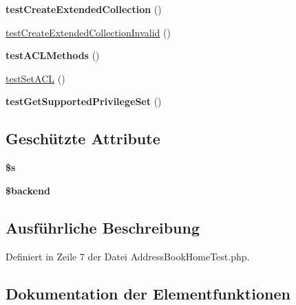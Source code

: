 \begin{DoxyCompactItemize}
\mbox{\label{class_sabre_1_1_card_d_a_v_1_1_address_book_home_test_ab820411cfd34b07fac5bac303b542208}} 
{\bfseries test\+Create\+Extended\+Collection} ()
\item 
\mbox{\hyperlink{class_sabre_1_1_card_d_a_v_1_1_address_book_home_test_a183b90b2e32963dc65a106dfca60597d}{test\+Create\+Extended\+Collection\+Invalid}} ()
\item 
\mbox{\label{class_sabre_1_1_card_d_a_v_1_1_address_book_home_test_ac26b7cca220adcf7f5667603dd3ce708}} 
{\bfseries test\+A\+C\+L\+Methods} ()
\item 
\mbox{\hyperlink{class_sabre_1_1_card_d_a_v_1_1_address_book_home_test_abfb7a825b347f0bd7d0af6ba4ae63881}{test\+Set\+A\+CL}} ()
\item 
\mbox{\label{class_sabre_1_1_card_d_a_v_1_1_address_book_home_test_a12458bb0e874ce1bbd678babc4ac7bed}} 
{\bfseries test\+Get\+Supported\+Privilege\+Set} ()
\end{DoxyCompactItemize}
\subsection*{Geschützte Attribute}
\begin{DoxyCompactItemize}
\item 
\mbox{\label{class_sabre_1_1_card_d_a_v_1_1_address_book_home_test_a394dff03ae5572bdc784b54f45ab8312}} 
{\bfseries \$s}
\item 
\mbox{\label{class_sabre_1_1_card_d_a_v_1_1_address_book_home_test_a198ebb1ed70b1c299cb7b4458f0e8123}} 
{\bfseries \$backend}
\end{DoxyCompactItemize}


\subsection{Ausführliche Beschreibung}


Definiert in Zeile 7 der Datei Address\+Book\+Home\+Test.\+php.



\subsection{Dokumentation der Elementfunktionen}
\mbox{\label{class_sabre_1_1_card_d_a_v_1_1_address_book_home_test_aa07e3663567e23e214f42a08387d0abc}} 

